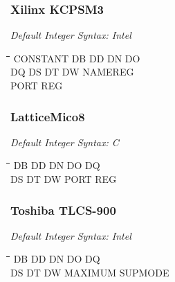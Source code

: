 \subsubsection{Xilinx KCPSM3}

{\em Default Integer Syntax: Intel}

{\tt\begin{tabbing}
\hspace{3cm}\=\hspace{3cm}\=\hspace{3cm}\=\hspace{3cm}\=\kill
CONSTANT   \> DB         \> DD          \> DN          \> DO \\
DQ         \> DS         \> DT          \> DW          \> NAMEREG \\
PORT       \> REG \\
\end{tabbing}}

\subsubsection{LatticeMico8}

{\em Default Integer Syntax: C}

{\tt\begin{tabbing}
\hspace{3cm}\=\hspace{3cm}\=\hspace{3cm}\=\hspace{3cm}\=\kill
DB         \> DD          \> DN         \> DO          \> DQ \\
DS         \> DT          \> DW         \> PORT        \> REG \\
\end{tabbing}}

\subsubsection{Toshiba TLCS-900}

{\em Default Integer Syntax: Intel}

{\tt\begin{tabbing}
\hspace{3cm}\=\hspace{3cm}\=\hspace{3cm}\=\hspace{3cm}\=\kill
DB         \> DD          \> DN         \> DO          \> DQ \\
DS         \> DT          \> DW         \> MAXIMUM     \> SUPMODE \\
\end{tabbing}}

